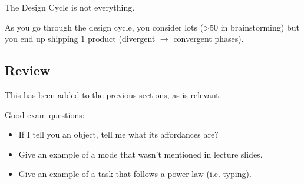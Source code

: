 The Design Cycle is not everything.

As you go through the design cycle, you consider lots (>50 in brainstorming) but you end up shipping 1 product (divergent $\to$ convergent phases).

\subsection{Review}
\begin{shaded}
This has been added to the previous sections, as is relevant.
\end{shaded}

Good exam questions: 
\begin{itemize}
    \item If I tell you an object, tell me what its affordances are?

    \item Give an example of a mode that wasn't mentioned in lecture slides.

    \item Give an example of a task that follows a power law (i.e. typing).
\end{itemize}
